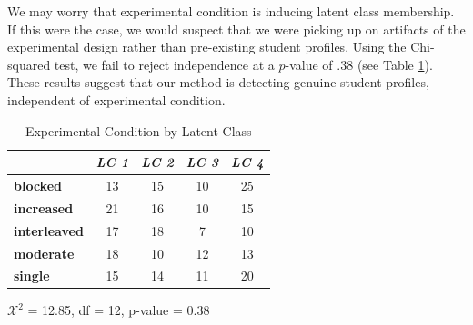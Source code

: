 \documentclass{edm_template}
\begin{document}
We may worry that experimental condition is inducing latent class membership. If this were the case, we would suspect that we were picking up on artifacts of the experimental design rather than pre-existing student profiles. Using the Chi-squared test, we fail to reject independence at a $p$-value of $.38$ (see Table \ref{tab:exp-and-lc}). These results suggest that our method is detecting genuine student profiles, independent of experimental condition. 


\begin{table}[hbtp]
\centering

\begin{tabular}{|l || c | c | c | c |}
\hline
&\emph{LC 1}&\emph{LC 2}&\emph{LC 3}&\emph{LC 4}\\ \hline \hline
\textbf{blocked}&     13& 15& 10& 25\\ \hline
\textbf{increased}&   21& 16& 10& 15\\ \hline
\textbf{interleaved}& 17& 18&  7& 10\\ \hline
\textbf{moderate}&    18& 10& 12& 13\\ \hline
\textbf{single}&      15& 14& 11& 20\\ \hline
 \end{tabular}
 
 \begin{center} $\mathcal{X}^2$ = 12.85, df = 12, p-value = 0.38 \end{center}
\caption{Experimental Condition by Latent Class}
\label{tab:exp-and-lc}
\end{table}
\end{document}

